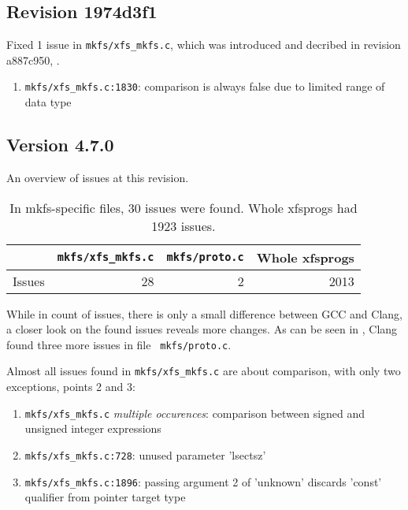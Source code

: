 \subsection{Revision 1974d3f1}
Fixed 1 issue in {\tt mkfs/xfs\_mkfs.c}, which was introduced and decribed in revision a887c950, .

\begin{enumerate}
	\item {\tt mkfs/xfs\_mkfs.c:1830}: comparison is always false due
		to limited range of data type
\end{enumerate}

\subsection{Version 4.7.0}\label{chap:results:gcc:4.7}

An overview of issues at this revision.
\begin{table}[h]
\begin{tabular}{|l||r|r||r|}
\hline
& {\tt mkfs/xfs\_mkfs.c} & {\tt mkfs/proto.c} & Whole xfsprogs \\
\hline
Issues & 28 & 2 & 2013 \\
\hline
\end{tabular}
\caption{In mkfs-specific files, 30 issues were found. Whole
xfsprogs had 1923 issues.}
\end{table}

While in count of issues, there is only a small difference between GCC and
Clang, a closer look on the found issues reveals more changes. As can be seen
in , Clang found three more issues in file {\tt
mkfs/proto.c}.

Almost all issues found in {\tt mkfs/xfs\_mkfs.c} are about comparison, with
only two exceptions, points 2 and 3:
\begin{enumerate}
	\item {\tt mkfs/xfs\_mkfs.c} {\em multiple occurences}: comparison
		between signed and unsigned integer expressions
	\item {\tt mkfs/xfs\_mkfs.c:728}: unused parameter 'lsectsz'
	\item {\tt mkfs/xfs\_mkfs.c:1896}: passing argument 2 of 'unknown'
		discards 'const' qualifier from pointer target type
\end{enumerate}


